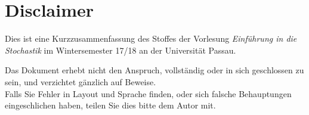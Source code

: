 \section*{Disclaimer}
\thispagestyle{empty}

Dies ist eine Kurzzusammenfassung des Stoffes der Vorlesung
\textit{Einführung in die Stochastik} im Wintersemester 17/18 an der Universität Passau.

Das Dokument erhebt nicht den Anspruch, vollständig oder in sich geschlossen zu sein, und verzichtet gänzlich auf Beweise.\\


Falls Sie Fehler in Layout und Sprache finden, oder sich falsche Behauptungen
eingeschlichen haben, teilen Sie dies bitte dem Autor mit.
